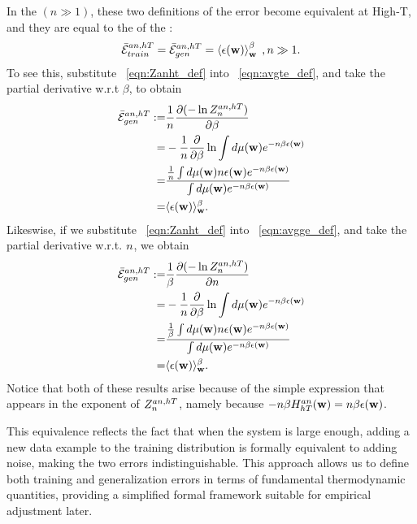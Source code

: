 In the \ThermodynamicLimit $(n \gg 1)$, these two definitions of the error become equivalent at High-T,
and they are equal to the \ThermalAverage of the \EffectivePotential:
\begin{align}
  \bar{\mathcal{E}}_{train}^{an, hT} = \bar{\mathcal{E}}_{gen}^{an, hT} = \left\langle \epsilon({\mathbf{w}}) \right\rangle_{\mathbf w}^{\beta}\;,n\gg 1 .
\end{align}
To see this, substitute \EQN~\ref{eqn:Zanht_def} into \EQN~\ref{eqn:avgte_def}, and take the partial derivative w.r.t $\beta$, to obtain
\begin{align}
  \label{eqn:avgge_anhT}
  \bar{\mathcal{E}}_{gen}^{an, hT} :=&\frac{1}{n}\dfrac{\partial (-\ln Z^{an,hT}_{n})}{\partial \beta}  \nonumber \\
   =& - \dfrac{1}{n}\dfrac{\partial}{\partial \beta}\ln\int d\mu({\mathbf{w}})e^{-n\beta\epsilon({\mathbf{w}})} \\  \nonumber
   =&  \dfrac{
              \tfrac{1}{n}  \int  d\mu({\mathbf{w}}) n\epsilon({\mathbf{w}}) e^{-n\beta\epsilon({\mathbf{w}})} 
             }{
              \int  d\mu({\mathbf{w}}) e^{-n\beta\epsilon({\mathbf{w}})} 
   } \nonumber \\
   =&\langle\epsilon({\mathbf{w}}) \rangle_{{\mathbf{w}}}^{\beta} .
  \end{align}
Likeswise, if we substitute \EQN~\ref{eqn:Zanht_def} into \EQN~\ref{eqn:avgge_def}, and take the partial derivative w.r.t. $n$, we obtain
\begin{align}
  \label{eqn:avgte_anhT}
    \bar{\mathcal{E}}_{gen}^{an, hT}  :=& \frac{1}{\beta}\dfrac{\partial (-\ln Z^{an,hT}_{n})}{\partial n} \nonumber \\
    =& - \dfrac{1}{n}\dfrac{\partial}{\partial \beta}\ln\int d\mu({\mathbf{w}})e^{-n\beta\epsilon({\mathbf{w}})} \\  \nonumber
   =&  \dfrac{
              \tfrac{1}{\beta}  \int  d\mu({\mathbf{w}}) n\epsilon({\mathbf{w}}) e^{-n\beta\epsilon({\mathbf{w}})} 
             }{
     \int  d\mu({\mathbf{w}}) e^{-n\beta\epsilon({\mathbf{w}})} 
   } \nonumber \\
   =&\langle\epsilon({\mathbf{w}}) \rangle_{{\mathbf{w}}}^{\beta} .
\end{align}
Notice that both of these results arise because of the simple expression that appears in the exponent of $Z^{an,hT}_{n}$, namely because $-n\beta H^{an}_{hT}({\mathbf{w}})=n\beta\epsilon({\mathbf{w}})$.


This equivalence reflects the fact that when the system is large enough, adding a new data example to the
training distribution is formally equivalent to adding noise, making the two errors indistinguishable.
This approach allows us to define both training and generalization errors in terms of fundamental thermodynamic quantities,
providing a simplified formal framework suitable for empirical adjustment later.

